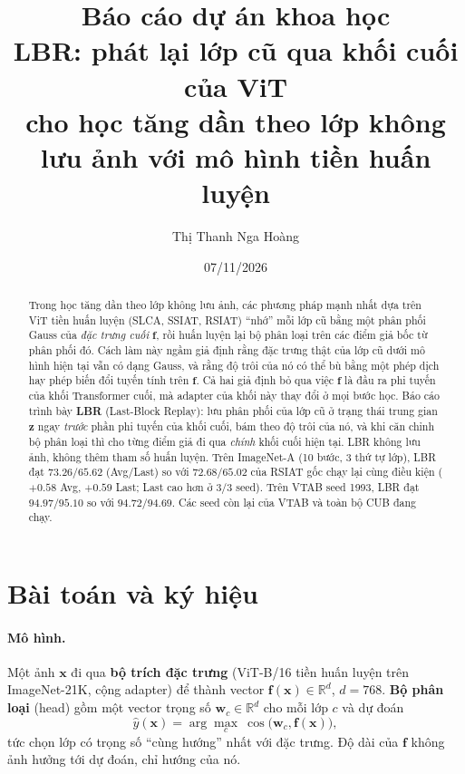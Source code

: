 \documentclass[11pt]{article}
\title{Báo cáo dự án khoa học\\[4pt]
\large LBR: phát lại lớp cũ qua khối cuối của ViT\\
cho học tăng dần theo lớp không lưu ảnh với mô hình tiền huấn luyện}
\author{Thị Thanh Nga Hoàng}
\date{07/11/2026}
\newcommand{\R}{\mathbb{R}}
\newcommand{\vf}{\mathbf{f}}
\newcommand{\vx}{\mathbf{x}}
\newcommand{\vz}{\mathbf{z}}
\newcommand{\vw}{\mathbf{w}}
\begin{document}
\maketitle

\begin{abstract}
Trong học tăng dần theo lớp không lưu ảnh, các phương pháp mạnh nhất dựa trên ViT tiền huấn luyện (SLCA, SSIAT, RSIAT)
``nhớ'' mỗi lớp cũ bằng một phân phối Gauss của \emph{đặc trưng cuối} $\vf$, rồi huấn luyện lại bộ phân loại trên các
điểm giả bốc từ phân phối đó. Cách làm này ngầm giả định rằng đặc trưng thật của lớp cũ dưới mô hình hiện tại vẫn có
dạng Gauss, và rằng độ trôi của nó có thể bù bằng một phép dịch hay phép biến đổi tuyến tính trên $\vf$. Cả hai giả
định bỏ qua việc $\vf$ là đầu ra phi tuyến của khối Transformer cuối, mà adapter của khối này thay đổi ở mọi bước học.
Báo cáo trình bày \textbf{LBR} (Last-Block Replay): lưu phân phối của lớp cũ ở trạng thái trung gian $\vz$ ngay
\emph{trước} phần phi tuyến của khối cuối, bám theo độ trôi của nó, và khi căn chỉnh bộ phân loại thì cho từng điểm giả
đi qua \emph{chính} khối cuối hiện tại. LBR không lưu ảnh, không thêm tham số huấn luyện. Trên ImageNet-A (10 bước,
3 thứ tự lớp), LBR đạt $\mathbf{73.26/65.62}$ (Avg/Last) so với $72.68/65.02$ của RSIAT gốc chạy lại cùng điều kiện
($+0.58$ Avg, $+0.59$ Last; Last cao hơn ở 3/3 seed). Trên VTAB seed 1993, LBR đạt $94.97/95.10$ so với $94.72/94.69$.
Các seed còn lại của VTAB và toàn bộ CUB đang chạy.
\end{abstract}

\tableofcontents
\newpage

\section{Bài toán và ký hiệu}\label{sec:setup}

\paragraph{Mô hình.} Một ảnh $\vx$ đi qua \textbf{bộ trích đặc trưng} (ViT-B/16 \cite{vit} tiền huấn luyện trên ImageNet-21K,
cộng adapter) để thành vector $\vf(\vx)\in\R^{d}$, $d=768$. \textbf{Bộ phân loại} (head) gồm một vector trọng số
$\vw_c\in\R^d$ cho mỗi lớp $c$ và dự đoán
\begin{equation}\label{eq:pred}
\hat y(\vx)=\arg\max_c\ \cos\big(\vw_c,\vf(\vx)\big),
\end{equation}
tức chọn lớp có trọng số ``cùng hướng'' nhất với đặc trưng. Độ dài của $\vf$ không ảnh hưởng tới dự đoán, chỉ hướng của
nó.
\end{document}
